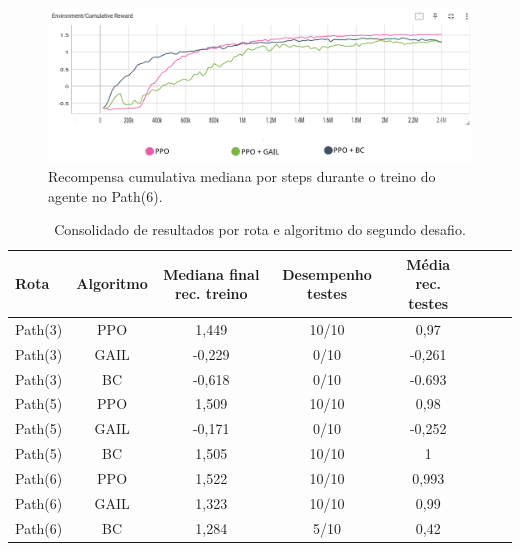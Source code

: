 \begin{figure}[h]
    \centering
    \includegraphics[scale=0.35]{figs/treinos/desafio-dificil/path-6_recompensas-algos.png}
    \caption{Recompensa cumulativa mediana por steps durante o treino do agente no Path(6).}
\end{figure}

\begin{table}[htpb]
    \centering
    \caption{Consolidado de resultados por rota e algoritmo do segundo desafio.}
    \label{resultado-tabela-desafio-2}
    \begin{tabular}{|l|c|c|c|c|c|c|r|}
         \hline
         \small{Rota} & \small{Algoritmo}   & \small{Mediana final rec. treino}  & \small{Desempenho testes}    & \small{Média rec. testes} \\ \hline
            Path(3)   &      PPO            &   1,449                            &    10/10                     &      0,97                 \\ \hline
            Path(3)   &      GAIL           &   -0,229                           &    0/10                      &      -0,261               \\ \hline
            Path(3)   &      BC             &   -0,618                           &    0/10                      &      -0.693               \\ \hline
            Path(5)   &      PPO            &   1,509                            &    10/10                     &      0,98                 \\ \hline
            Path(5)   &      GAIL           &   -0,171                           &    0/10                      &      -0,252               \\ \hline
            Path(5)   &      BC             &   1,505                            &    10/10                     &      1                    \\ \hline
            Path(6)   &      PPO            &   1,522                            &    10/10                     &      0,993                \\ \hline
            Path(6)   &      GAIL           &   1,323                            &    10/10                     &      0,99                 \\ \hline
            Path(6)   &      BC             &   1,284                            &    5/10                      &      0,42                 \\ \hline
    \end{tabular}
\end{table}

